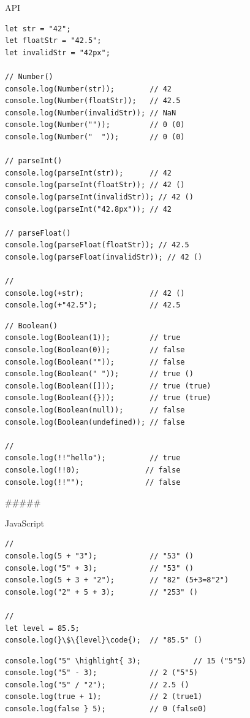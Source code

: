 {API

\begin{lstlisting}[style=javascript]
let str = "42";
let floatStr = "42.5";
let invalidStr = "42px";

// Number()
console.log(Number(str));        // 42
console.log(Number(floatStr));   // 42.5
console.log(Number(invalidStr)); // NaN
console.log(Number(""));         // 0 (0)
console.log(Number("  "));       // 0 (0)

// parseInt()
console.log(parseInt(str));      // 42
console.log(parseInt(floatStr)); // 42 ()
console.log(parseInt(invalidStr)); // 42 ()
console.log(parseInt("42.8px")); // 42

// parseFloat()  
console.log(parseFloat(floatStr)); // 42.5
console.log(parseFloat(invalidStr)); // 42 ()

// 
console.log(+str);               // 42 ()
console.log(+"42.5");            // 42.5
\end{lstlisting}

\important{}

\begin{lstlisting}[style=javascript]
// Boolean()
console.log(Boolean(1));         // true
console.log(Boolean(0));         // false
console.log(Boolean(""));        // false
console.log(Boolean(" "));       // true ()
console.log(Boolean([]));        // true (true)
console.log(Boolean({}));        // true (true)
console.log(Boolean(null));      // false
console.log(Boolean(undefined)); // false

// 
console.log(!!"hello");          // true
console.log(!!0);               // false
console.log(!!"");              // false
\end{lstlisting}

##### 

JavaScript

\important{}

\begin{lstlisting}[style=javascript]
// 
console.log(5 + "3");            // "53" ()
console.log("5" + 3);            // "53" ()
console.log(5 + 3 + "2");        // "82" (5+3=8"2")
console.log("2" + 5 + 3);        // "253" ()

// 
let level = 85.5;
console.log(}\$\{level}\code{);  // "85.5" ()
\end{lstlisting}

\important{}  

\begin{lstlisting}[style=javascript]
console.log("5" \highlight{ 3);            // 15 ("5"5)
console.log("5" - 3);            // 2 ("5"5)
console.log("5" / "2");          // 2.5 ()
console.log(true + 1);           // 2 (true1)
console.log(false } 5);          // 0 (false0)


\end{lstlisting}}
